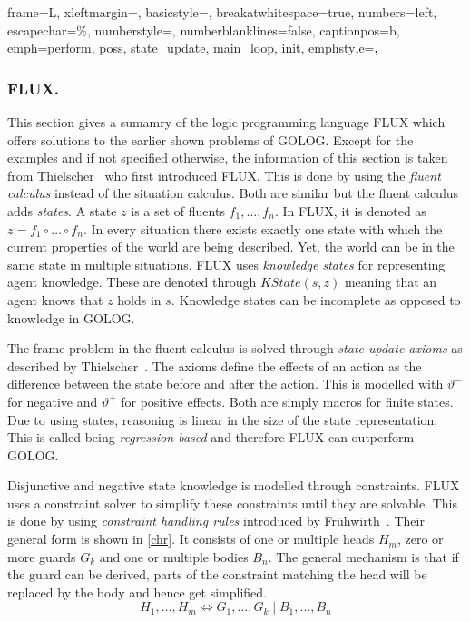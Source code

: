  {
  frame=L,
  xleftmargin=\parindent,
  basicstyle=\footnotesize\ttfamily,
  breakatwhitespace=true,
  numbers=left,
  escapechar=\%,
  numberstyle=\tiny,
  numberblanklines=false,
  captionpos=b,
  emph={perform, poss, state\_update, main\_loop, init},
  emphstyle=\textbf,
}
%
\lstset{style=flux} %
\subsubsection{FLUX.}\label{fun:apl_flux}
This section gives a sumamry of the logic programming language FLUX which offers solutions to the earlier shown problems of GOLOG. Except for the examples and if not specified otherwise, the information of this section is taken from Thielscher~\cite{thielscher_flux:_2005} who first introduced FLUX. This is done by using the \emph{fluent calculus} instead of the situation calculus. Both are similar but the fluent calculus adds \emph{states}. A state $z$ is a set of fluents $f_1,\dotsc,f_n$. In FLUX, it is denoted as $z = f_1 \circ\dotsc\circ f_n$. In every situation there exists exactly one state with which the current properties of the world are being described. Yet, the world can be in the same state in multiple situations. FLUX uses \emph{knowledge states} for representing agent knowledge. These are denoted through $\textit{KState}(s,z)$ meaning that an agent knows that $z$ holds in $s$. Knowledge states can be incomplete as opposed to knowledge in GOLOG.

The frame problem in the fluent calculus is solved through \emph{state update axioms} as described by Thielscher~\cite{thielscher_situation_1999}. The axioms define the effects of an action as the difference between the state before and after the action. This is modelled with $\vartheta^-$ for negative and $\vartheta^+$ for positive effects. Both are simply macros for finite states. Due to using states, reasoning is linear in the size of the state representation. This is called being \emph{regression-based} and therefore FLUX can outperform GOLOG. %

Disjunctive and negative state knowledge is modelled through constraints. FLUX uses a constraint solver to simplify these constraints until they are solvable. This is done by using \emph{constraint handling rules} introduced by Frühwirth~\cite{fruhwirth_theory_1998}. Their general form is shown in \autoref{chr}. It consists of one or multiple heads $H_m$, zero or more guards $G_k$ and one or multiple bodies $B_n$. The general mechanism is that if the guard can be derived, parts of the constraint matching the head will be replaced by the body and hence get simplified.
\begin{equation}\label{chr}
  H_1,\ldots,H_m\Leftrightarrow G_1,\ldots,G_k \mid B_1,\ldots,B_n
\end{equation}

